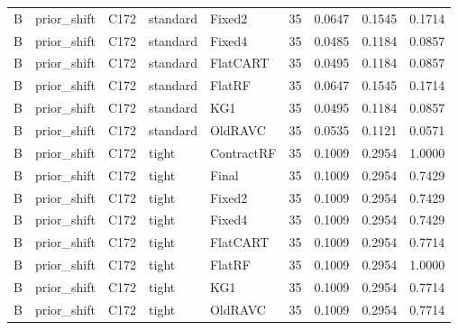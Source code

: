 \begin{longtable}{@{}lllllllll@{}}
B & prior\_shift & C172 & standard & Fixed2 & 35 & 0.0647 & 0.1545 & 0.1714\\
B & prior\_shift & C172 & standard & Fixed4 & 35 & 0.0485 & 0.1184 & 0.0857\\
B & prior\_shift & C172 & standard & FlatCART & 35 & 0.0495 & 0.1184 & 0.0857\\
B & prior\_shift & C172 & standard & FlatRF & 35 & 0.0647 & 0.1545 & 0.1714\\
B & prior\_shift & C172 & standard & KG1 & 35 & 0.0495 & 0.1184 & 0.0857\\
B & prior\_shift & C172 & standard & OldRAVC & 35 & 0.0535 & 0.1121 & 0.0571\\
B & prior\_shift & C172 & tight & ContractRF & 35 & 0.1009 & 0.2954 & 1.0000\\
B & prior\_shift & C172 & tight & Final & 35 & 0.1009 & 0.2954 & 0.7429\\
B & prior\_shift & C172 & tight & Fixed2 & 35 & 0.1009 & 0.2954 & 0.7429\\
B & prior\_shift & C172 & tight & Fixed4 & 35 & 0.1009 & 0.2954 & 0.7429\\
B & prior\_shift & C172 & tight & FlatCART & 35 & 0.1009 & 0.2954 & 0.7714\\
B & prior\_shift & C172 & tight & FlatRF & 35 & 0.1009 & 0.2954 & 1.0000\\
B & prior\_shift & C172 & tight & KG1 & 35 & 0.1009 & 0.2954 & 0.7714\\
B & prior\_shift & C172 & tight & OldRAVC & 35 & 0.1009 & 0.2954 & 0.7714\\
\bottomrule\end{longtable}\normalsize\setlength{\tabcolsep}{6pt}
